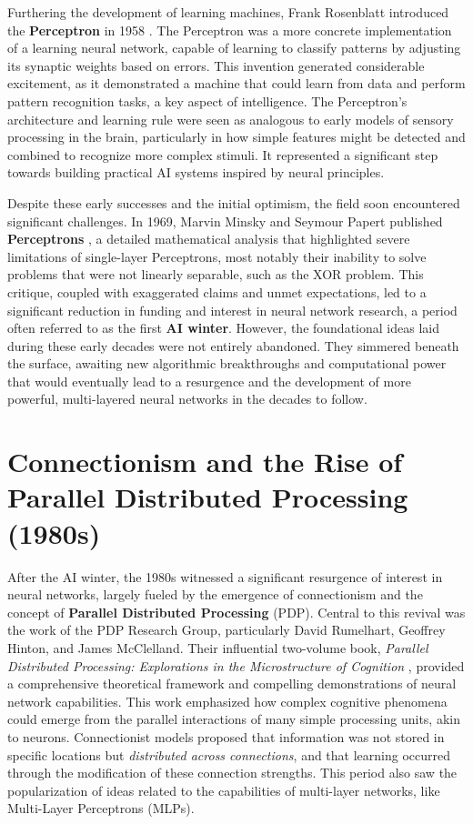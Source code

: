 Furthering the development of learning machines, Frank Rosenblatt introduced the \textbf{Perceptron} in 1958 \cite{rosenblatt1958perceptron}. The Perceptron was a more concrete implementation of a learning neural network, capable of learning to classify patterns by adjusting its synaptic weights based on errors. This invention generated considerable excitement, as it demonstrated a machine that could learn from data and perform pattern recognition tasks, a key aspect of intelligence. The Perceptron's architecture and learning rule were seen as analogous to early models of sensory processing in the brain, particularly in how simple features might be detected and combined to recognize more complex stimuli. It represented a significant step towards building practical AI systems inspired by neural principles.

Despite these early successes and the initial optimism, the field soon encountered significant challenges. In 1969, Marvin Minsky and Seymour Papert published \textbf{Perceptrons} \cite{minsky1969perceptrons}, a detailed mathematical analysis that highlighted severe limitations of single-layer Perceptrons, most notably their inability to solve problems that were not linearly separable, such as the XOR problem. This critique, coupled with exaggerated claims and unmet expectations, led to a significant reduction in funding and interest in neural network research, a period often referred to as the first \textbf{AI winter}. However, the foundational ideas laid during these early decades were not entirely abandoned. They simmered beneath the surface, awaiting new algorithmic breakthroughs and computational power that would eventually lead to a resurgence and the development of more powerful, multi-layered neural networks in the decades to follow.

\section{Connectionism and the Rise of Parallel Distributed Processing (1980s)}

After the AI winter, the 1980s witnessed a significant resurgence of interest in neural networks, largely fueled by the emergence of connectionism and the concept of \textbf{Parallel Distributed Processing} (PDP). Central to this revival was the work of the PDP Research Group, particularly David Rumelhart, Geoffrey Hinton, and James McClelland. Their influential two-volume book, \textit{Parallel Distributed Processing: Explorations in the Microstructure of Cognition} \cite{mcclelland1986parallel}, provided a comprehensive theoretical framework and compelling demonstrations of neural network capabilities. This work emphasized how complex cognitive phenomena could emerge from the parallel interactions of many simple processing units, akin to neurons. Connectionist models proposed that information was not stored in specific locations but \textit{distributed across connections}, and that learning occurred through the modification of these connection strengths. This period also saw the popularization of ideas related to the capabilities of multi-layer networks, like Multi-Layer Perceptrons (MLPs).

